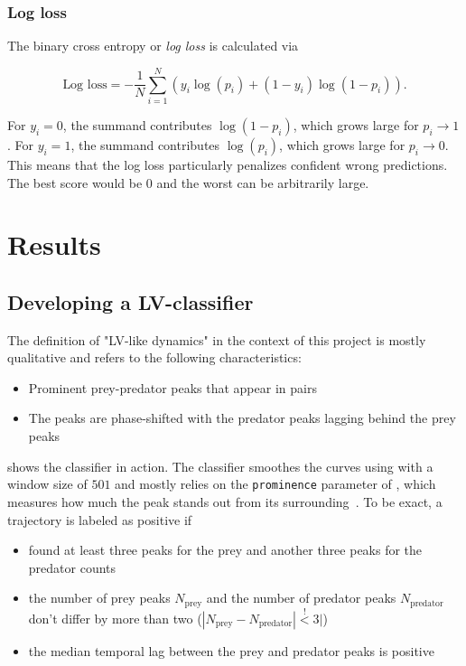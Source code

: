 \documentclass[a4paper]{scrartcl}
\begin{document}
\subsubsection{Log loss}
\label{subsubsection_log_loss}
The binary cross entropy or \textit{log loss} is calculated via

\begin{equation*}
    \text{Log loss} = -\frac{1}{N}\sum_{i=1}^N\left(y_i\log(p_i)+(1-y_i)\log(1-p_i)\right).
\end{equation*}

For $y_i = 0$, the summand contributes $\log(1-p_i)$, which grows large for $p_i \rightarrow 1$. For $y_i = 1$, the summand contributes $\log(p_i)$, which grows large for $p_i \rightarrow 0$. This means that the log loss particularly penalizes confident wrong predictions. The best score would be $0$ and the worst can be arbitrarily large.

\section{Results}
\subsection{Developing a LV-classifier}
The definition of "LV-like dynamics" in the context of this project is mostly qualitative and refers to the following characteristics:

\begin{itemize}
    \item Prominent prey-predator peaks that appear in pairs
    \item The peaks are phase-shifted with the predator peaks lagging behind the prey peaks
\end{itemize}

 shows the classifier in action. The classifier smoothes the curves using  with a window size of $501$ and mostly relies on the \texttt{prominence} parameter of , which measures how much the peak stands out from its surrounding~\cite{prominence}. To be exact, a trajectory is labeled as positive if

\begin{itemize}
    \item {} found at least three peaks for the prey and another three peaks for the predator counts
    \item the number of prey peaks $N_{\text{prey}}$ and the number of predator peaks $N_{\text{predator}}$ don't differ by more than two ($|N_{\text{prey}} - N_{\text{predator}}| \overset{!}{<} 3|$)
    \item the median temporal lag between the prey and predator peaks is positive
\end{itemize}
\end{document}
